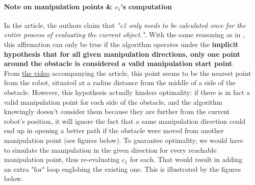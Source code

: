 \paragraph{Note on manipulation points \& $c_{1}$'s computation}\label{c1_computation_note} In the article, the authors claim that \textit{"c1 only needs to be calculated once for the entire process of evaluating the current object."}. With the same reasoning as in , this affirmation can only be true if the algorithm operates under the \textbf{implicit hypothesis that for all given manipulation directions, only one point around the obstacle is considered a valid manipulation start point}. From \href{https://youtu.be/3AvfPVzBb-s}{the video} accompanying the article, this point seems to be the nearest point from the robot, situated at a radius distance from the middle of a side of the obstacle. However, this hypothesis actually hinders optimality: if there is in fact a valid manipulation point for each side of the obstacle, and the algorithm knowingly doesn't consider them because they are further from the current robot's position, it will ignore the fact that a same manipulation direction could end up in opening a better path if the obstacle were moved from another manipulation point (see figures below). To guarantee optimality, we would have to simulate the manipulation in the given direction for every reachable manipulation point, thus re-evaluating $c_{1}$ for each. That would result in adding an extra "for" loop englobing the existing one. This is illustrated by the figures below.

